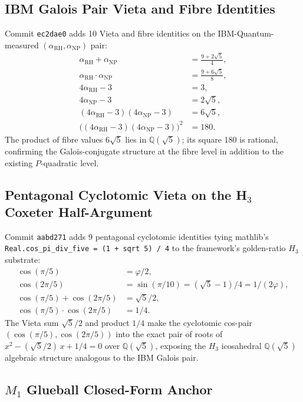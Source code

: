 \subsection{IBM Galois Pair Vieta and Fibre Identities}

Commit \texttt{ec2dae0} adds 10 Vieta and fibre identities on the
IBM-Quantum-measured $(\alpha_{\text{RH}}, \alpha_{\text{NP}})$ pair:
\begin{align*}
\alpha_{\text{RH}} + \alpha_{\text{NP}} &= \tfrac{9 + 2\sqrt{5}}{4}, \\
\alpha_{\text{RH}} \cdot \alpha_{\text{NP}} &= \tfrac{9 + 6\sqrt{5}}{8}, \\
4\alpha_{\text{RH}} - 3 &= 3, \\
4\alpha_{\text{NP}} - 3 &= 2\sqrt{5}, \\
(4\alpha_{\text{RH}} - 3)(4\alpha_{\text{NP}} - 3) &= 6\sqrt{5}, \\
\bigl((4\alpha_{\text{RH}} - 3)(4\alpha_{\text{NP}} - 3)\bigr)^2 &= 180.
\end{align*}
The product of fibre values $6\sqrt{5}$ lies in $\mathbb{Q}(\sqrt{5})$;
its square 180 is rational, confirming the Galois-conjugate structure
at the fibre level in addition to the existing $P$-quadratic level.

\subsection{Pentagonal Cyclotomic Vieta on the H\texorpdfstring{$_3$}{\_3} Coxeter Half-Argument}

Commit \texttt{aabd271} adds 9 pentagonal cyclotomic identities tying
mathlib's \verb|Real.cos_pi_div_five = (1 + sqrt 5) / 4| to the
framework's golden-ratio $H_3$ substrate:
\begin{align*}
\cos(\pi/5) &= \varphi/2, \\
\cos(2\pi/5) &= \sin(\pi/10) = (\sqrt{5}-1)/4 = 1/(2\varphi), \\
\cos(\pi/5) + \cos(2\pi/5) &= \sqrt{5}/2, \\
\cos(\pi/5) \cdot \cos(2\pi/5) &= 1/4.
\end{align*}
The Vieta sum $\sqrt{5}/2$ and product $1/4$ make the cyclotomic
cos-pair $(\cos(\pi/5), \cos(2\pi/5))$ into the exact pair of roots
of $x^2 - (\sqrt{5}/2)\,x + 1/4 = 0$ over $\mathbb{Q}(\sqrt{5})$,
exposing the $H_3$ icosahedral $\mathbb{Q}(\sqrt{5})$ algebraic
structure analogous to the IBM Galois pair.

\subsection{\texorpdfstring{$M_1$}{M\_1} Glueball Closed-Form Anchor}


